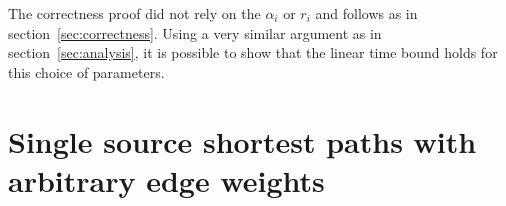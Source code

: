 \documentclass[12pt]{article}
\begin{document}
The correctness proof did not rely on the $\alpha_i$ or $r_i$ and follows as in section~\ref{sec:correctness}. Using a very similar argument as in section~\ref{sec:analysis}, it is possible to show that the linear time bound holds for this choice of parameters.

\section{Single source shortest paths with arbitrary edge weights}
\label{sec:arbitr-edge-weights}




\end{document}
